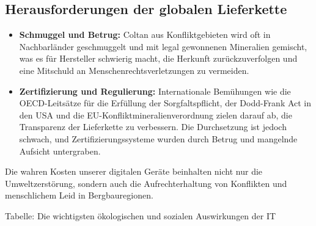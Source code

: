 \documentclass[
  nswissgerman,
  a4paper,
  DIV=11,
  numbers=noendperiod,
  ngerman]{scrreprt}
\begin{document}
\subsection{Herausforderungen der globalen
Lieferkette}\label{herausforderungen-der-globalen-lieferkette}

\begin{itemize}
\item
  \textbf{Schmuggel und Betrug:} Coltan aus Konfliktgebieten wird oft in
  Nachbarländer geschmuggelt und mit legal gewonnenen Mineralien
  gemischt, was es für Hersteller schwierig macht, die Herkunft
  zurückzuverfolgen und eine Mitschuld an Menschenrechtsverletzungen zu
  vermeiden.
\item
  \textbf{Zertifizierung und Regulierung:} Internationale Bemühungen wie
  die OECD-Leitsätze für die Erfüllung der Sorgfaltspflicht, der
  Dodd-Frank Act in den USA und die EU-Konfliktmineralienverordnung
  zielen darauf ab, die Transparenz der Lieferkette zu verbessern. Die
  Durchsetzung ist jedoch schwach, und Zertifizierungssysteme wurden
  durch Betrug und mangelnde Aufsicht untergraben.
\end{itemize}

\begin{tcolorbox}[enhanced jigsaw, arc=.35mm, bottomrule=.15mm, bottomtitle=1mm, breakable, colback=white, colbacktitle=quarto-callout-note-color!10!white, colframe=quarto-callout-note-color-frame, coltitle=black, left=2mm, leftrule=.75mm, opacityback=0, opacitybacktitle=0.6, rightrule=.15mm, title=\textcolor{quarto-callout-note-color}{\faInfo}\hspace{0.5em}{Wichtigste Erkenntnis}, titlerule=0mm, toprule=.15mm, toptitle=1mm]

Die wahren Kosten unserer digitalen Geräte beinhalten nicht nur die
Umweltzerstörung, sondern auch die Aufrechterhaltung von Konflikten und
menschlichem Leid in Bergbauregionen.

\end{tcolorbox}

Tabelle: Die wichtigsten ökologischen und sozialen Auswirkungen der IT
\end{document}

